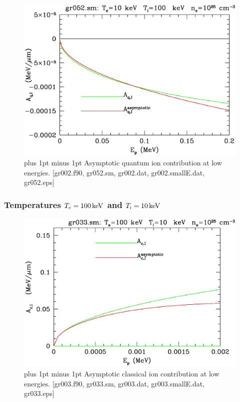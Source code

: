 \documentclass[preprint,12pt,eqsecnum,nofootinbib,amsmath,amssymb]{revtex4}
\newcommand{\smI}{{\rm\scriptscriptstyle I}}
\newcommand{\footnoteskip}{\baselineskip 12pt plus 1pt minus 1pt}
\begin{document}
\vskip-2cm 
\begin{figure}[h!]
\includegraphics[scale=0.45]{gr052.eps} 
\vskip-0.8cm 
\caption{\footnoteskip  
  Asymptotic quantum ion contribution at low energies. [gr002.f90,
  gr052.sm, gr002.dat, gr002.smallE.dat, gr052.eps]
}
\label{fig:gr052}
\end{figure}


\pagebreak
\subsubsection{Temperatures $T_e=100\,{\rm keV}$ and $T_\smI=10\,{\rm keV}$}

\vskip-2cm 
\begin{figure}[h!]
\includegraphics[scale=0.45]{gr033.eps} 
\vskip-0.8cm 
\caption{\footnoteskip  
  Asymptotic classical ion contribution at low energies. [gr003.f90,
  gr033.sm, gr003.dat, gr003.smallE.dat, gr033.eps]
}
\label{fig:gr033}
\end{figure}
\end{document}

